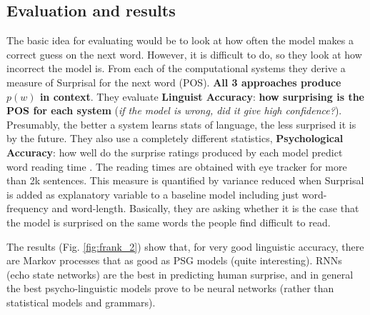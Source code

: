 \subsection{Evaluation and results}
The basic idea for evaluating would be to look at how often the model makes a correct guess on the next word. However, it is difficult to do, so they look at how incorrect the model is. 
From each of the computational systems they derive a measure of Surprisal for the next word (POS). \textbf{All 3 approaches produce $p(w)$ in context}. 
They evaluate \textbf{Linguist Accuracy}: \textbf{how surprising is the POS for each system} (\textit{if the model is wrong, did it give high confidence?}). Presumably, the better a system learns stats of language, the less surprised it is by the future.
They also use a completely different statistics, \textbf{Psychological Accuracy}: how well do the surprise ratings produced by each model predict word reading time \notet.
The reading times are obtained with eye tracker for more than 2k sentences. This measure is quantified by variance reduced when Surprisal is added as explanatory variable to a baseline model including just word-frequency and word-length. Basically, they are asking whether it is the case that the model is surprised on the same words the people find difficult to read.


The results (Fig. \ref{fig:frank_2}) show that, for very good linguistic accuracy, there are Markov processes that as good as PSG models (quite interesting).
RNNs (echo state networks) are the best in predicting human surprise, and in general the best psycho-linguistic models prove to be neural networks (rather than statistical models and grammars).

